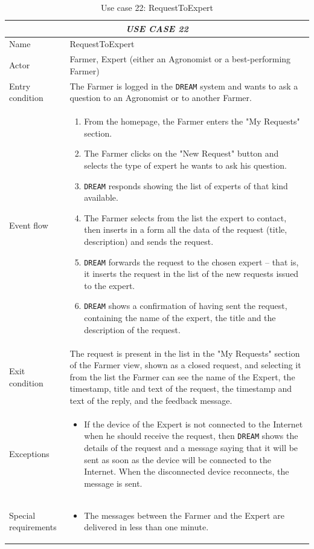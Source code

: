 \documentclass{article}
\begin{document}
\centering
\begin{longtable}{|p{3.5cm}|m{8cm}|}
\caption{Use case 22: RequestToExpert}
 \label{uc22}
 \hline
 \multicolumn{2}{|c|}{\cellcolor{white}\emph{USE CASE 22}} \\
 \endfirsthead
 \endhead
 \endfoot
 \endlastfoot
 \hline
 Name & RequestToExpert\\
 \hline
 Actor & Farmer, Expert (either an Agronomist or a best-performing Farmer)\\
 \hline
 Entry condition & The Farmer is logged in the \verb|DREAM| system and wants to ask a question to an Agronomist or to another Farmer.\\
 \hline
 Event flow & \begin{enumerate}
    \item From the homepage, the Farmer enters the "My Requests" section.
    \item The Farmer clicks on the "New Request" button and selects the type of expert he wants to ask his question.
    \item \verb|DREAM| responds showing the list of experts of that kind available.
    \item The Farmer selects from the list the expert to contact, then inserts in a form all the data of the request (title, description) and sends the request.
    \item \verb|DREAM| forwards the request to the chosen expert – that is, it inserts the request in the list of the new requests issued to the expert.
    \item \verb|DREAM| shows a confirmation of having sent the request, containing the name of the expert, the title and the description of the request.
 \end{enumerate}\\
 \hline
 Exit condition & The request is present in the list in the "My Requests" section of the Farmer view, shown as a closed request, and selecting it from the list the Farmer can see the name of the Expert, the timestamp, title and text of the request, the timestamp and text of the reply, and the feedback message.\\
 \hline
 Exceptions & \begin{itemize}
    \item If the device of the Expert is not connected to the Internet when he should receive the request, then \verb|DREAM| shows the details of the request and a message saying that it will be sent as soon as the device will be connected to the Internet. When the disconnected device reconnects, the message is sent.
 \end{itemize}\\
 \hline
 Special requirements & \begin{itemize}
     \item The messages between the Farmer and the Expert are delivered in less than one minute.
 \end{itemize}\\
 \hline
\end{longtable}
\end{document}
